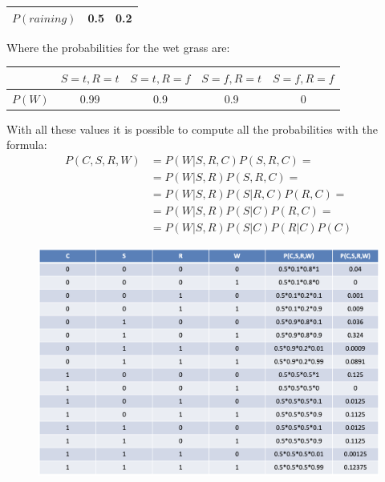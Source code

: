 \documentclass[12pt, a4paper]{report}
\begin{document}
\begin{example}
\begin{table}[H]
\begin{tabular}{c|cc|}
            \multicolumn{1}{|c|}{$P(raining)$} & 0.5         & 0.2          \\ \hline
            \end{tabular}
        \end{table}
        Where the probabilities for the wet grass are: 
        \begin{table}[H]
            \centering
            \begin{tabular}{c|cccc|}
            \cline{2-5}
                                         & $S=t,R=t$ & $S=t,R=f$ & $S=f,R=t$ & $S=f,R=f$ \\ \hline
            \multicolumn{1}{|c|}{$P(W)$} & 0.99                      & 0.9                        & 0.9                       & 0                                 \\ \hline
            \end{tabular}
        \end{table}
        With all these values it is possible to compute all the probabilities with the formula: 
        \[
        \begin{aligned}
            P(C,S,R,W)  &= P(W|S,R,C)P(S,R,C)=      \\
                        &= P(W|S,R)P(S,R,C)=        \\
                        &= P(W|S,R)P(S|R,C)P(R,C)=  \\
                        &= P(W|S,R)P(S|C)P(R,C)=    \\
                        &= P(W|S,R)P(S|C)P(R|C)P(C)
        \end{aligned}
        \]
        \begin{figure}[H]
            \centering
            \includegraphics[width=0.9\linewidth]{images/probabilities.png}
        \end{figure}
    \end{example}
\end{document}
